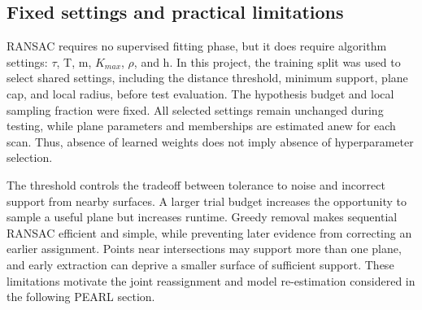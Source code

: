\subsection{Fixed settings and practical limitations}\label{fixed-settings-and-practical-limitations}

RANSAC requires no supervised fitting phase, but it does require algorithm settings: \(\tau\), T, m, \(K_{max}\), \(\rho\), and h. In this project, the training split was used to select shared settings, including the distance threshold, minimum support, plane cap, and local radius, before test evaluation. The hypothesis budget and local sampling fraction were fixed. All selected settings remain unchanged during testing, while plane parameters and memberships are estimated anew for each scan. Thus, absence of learned weights does not imply absence of hyperparameter selection.

The threshold controls the tradeoff between tolerance to noise and incorrect support from nearby surfaces. A larger trial budget increases the opportunity to sample a useful plane but increases runtime. Greedy removal makes sequential RANSAC efficient and simple, while preventing later evidence from correcting an earlier assignment. Points near intersections may support more than one plane, and early extraction can deprive a smaller surface of sufficient support. These limitations motivate the joint reassignment and model re-estimation considered in the following PEARL section.
